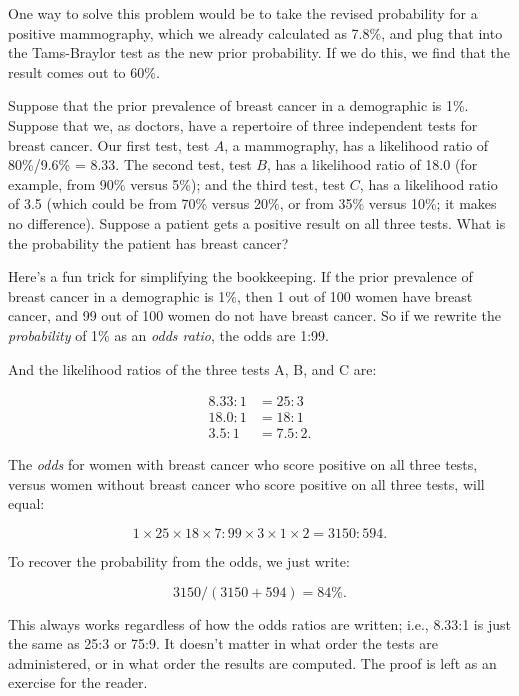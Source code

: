 {
 One way to solve this problem would be to take the revised
probability for a positive mammography, which we already calculated as
7.8\%, and plug that into the Tams-Braylor test as the new prior
probability. If we do this, we find that the result comes out to 60\%.}

{
 Suppose that the prior prevalence of breast cancer in a
demographic is 1\%. Suppose that we, as doctors, have a repertoire of
three independent tests for breast cancer. Our first test, test $A$, a
mammography, has a likelihood ratio of 80\%/9.6\% = 8.33. The second
test, test $B$, has a likelihood ratio of 18.0 (for example, from 90\%
versus 5\%); and the third test, test $C$, has a likelihood ratio of 3.5
(which could be from 70\% versus 20\%, or from 35\% versus 10\%; it
makes no difference). Suppose a patient gets a positive result on all
three tests. What is the probability the patient has breast cancer?}

{
 Here's a fun trick for simplifying the
bookkeeping. If the prior prevalence of breast cancer in a demographic
is 1\%, then 1 out of 100 women have breast cancer, and 99 out of 100
women do not have breast cancer. So if we rewrite the
\textit{probability} of 1\% as an \textit{odds ratio}, the odds are
1:99.}

{
 And the likelihood ratios of the three tests A, B, and C are:}

\begin{align*}
 8.33:1 &= 25:3\\
 18.0:1 &= 18:1\\
 3.5:1 &= 7.5:2.
\end{align*}

{
 The \textit{odds} for women with breast cancer who score positive
on all three tests, versus women without breast cancer who score
positive on all three tests, will equal:}

\begin{equation*}
 1 \times 25 \times 18 \times 7 : 99 \times 3 \times 1 \times 2 = 3150 : 594.
\end{equation*}

{
 To recover the probability from the odds, we just write:}

\begin{equation*}
 3150 / (3150 + 594) = 84\%.
\end{equation*}


{
 This always works regardless of how the odds ratios are written;
i.e., 8.33:1 is just the same as 25:3 or 75:9. It
doesn't matter in what order the tests are
administered, or in what order the results are computed. The proof is
left as an exercise for the reader.}

